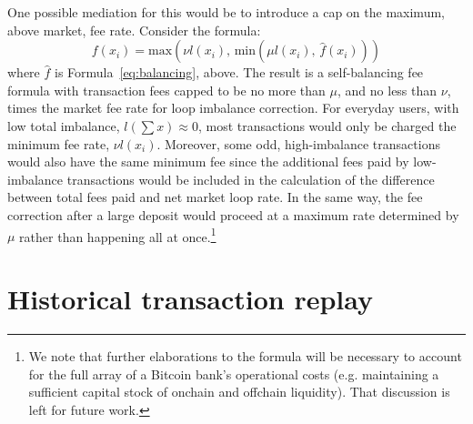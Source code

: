 \documentclass[10pt,twocolumn]{article}
\begin{document}
One possible mediation for this would be to
introduce a cap on the maximum, above market, fee rate.
Consider the formula:
\begin{equation} \label{eq:cap}
	f(x_i) = \mathrm{max}\left( \nu l(x_i),\,
		\mathrm{min}\left( \mu l(x_i),\, \hat{f}(x_i) \right)\right)
\end{equation}
where $\hat{f}$ is Formula~\ref{eq:balancing}, above.
The result is a self-balancing fee formula with
transaction fees capped to be no more than $\mu$,
and no less than $\nu$,
times the market fee rate for loop imbalance correction.
For everyday users, with low total imbalance,
$l\left(\sum x \right)\approx0$,
most transactions would only be charged the minimum fee rate, $\nu l(x_i)$.
Moreover, some odd, high-imbalance transactions
would also have the same minimum fee since
the additional fees paid by low-imbalance transactions
would be included in the calculation of the difference
between total fees paid and net market loop rate.
In the same way, the fee correction after
a large deposit would proceed at a maximum
rate determined by $\mu$ rather than happening all at once.\footnote{
	We note that further elaborations to the formula will be necessary
	to account for the full array of a Bitcoin bank's operational costs
	(e.g. maintaining a sufficient capital stock of onchain and offchain liquidity).
	That discussion is left for future work.
}

\section{Historical transaction replay}
\end{document}
